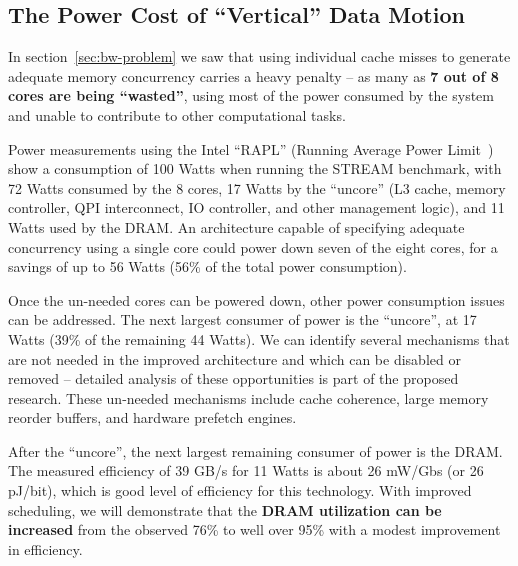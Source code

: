 \subsection{The Power Cost of ``Vertical'' Data Motion}
\label{sec:power-problem}

In section~\ref{sec:bw-problem} we saw that using individual cache misses 
to generate adequate memory concurrency carries a heavy penalty -- as many
as \textbf{7 out of 8 cores are being ``wasted''}, using most of the power 
consumed by the system and unable to contribute to other computational tasks.  

Power measurements using the Intel ``RAPL'' (Running Average Power 
Limit~\cite{Intel_SWDevManV3}) show a consumption of 100 Watts when running the 
STREAM benchmark, with 72 Watts consumed by the 8 cores, 17 Watts by the 
``uncore'' (L3 cache, memory controller, QPI interconnect, IO controller, and
other management logic), and 11 Watts used by the DRAM.   An architecture
capable of specifying adequate concurrency using a single core could power down
seven of the eight cores, for a savings of up to 56 Watts (56\% of the total power
consumption).

Once the un-needed cores can be powered down, other power consumption
issues can be addressed.  The next largest consumer of power is the ``uncore'', at 17 Watts
(39\% of the remaining 44 Watts).   We can identify several mechanisms
that are not needed in the improved architecture and which can be disabled or removed -- 
detailed analysis of these opportunities is part of the proposed research.   These un-needed
mechanisms include cache coherence, large memory reorder buffers, and hardware
prefetch engines.

\begin{comment}
These un-needed mechanisms include the chip-to-chip
cache coherence traffic over the QPI links (which is not actually needed, since 
none of the data being accessed is shared), large reorder buffers in the memory
controllers (required to attempt to recover the simple memory access patterns
that were obfuscated when the code was split up to run across multiple cores), 
hardware prefetch engines (required only because the software had no means 
of requesting the desired data transfers).
\end{comment}

After the ``uncore'', the next largest remaining consumer of power is the DRAM.
The measured efficiency of 39 GB/s for 11 Watts is about 26 mW/Gbs (or 26 pJ/bit),
which is good level of efficiency for this technology.  With improved scheduling, we 
will demonstrate that the 
\textbf{DRAM utilization can be increased} from the observed 76\% 
to well over 95\% with a modest improvement in efficiency.

